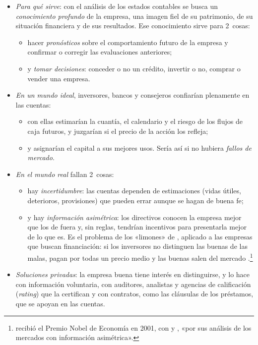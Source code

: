 \documentclass[11pt]{article}
\begin{document}
\begin{itemize}
\item \emph{Para qué sirve}: con el análisis de los estados contables se busca un \emph{conocimiento profundo} de la empresa, una imagen fiel de su patrimonio, de su situación financiera y de sus resultados. Ese conocimiento sirve para 2~cosas:
  \begin{itemize}
  \item hacer \emph{pronósticos} sobre el comportamiento futuro de la empresa y confirmar o corregir las evaluaciones anteriores;
  \item y \emph{tomar decisiones}: conceder o no un crédito, invertir o no, comprar o vender una empresa.
  \end{itemize}
\item \emph{En un mundo ideal}, inversores, bancos y consejeros confiarían plenamente en las cuentas:
  \begin{itemize}
  \item con ellas estimarían la cuantía, el calendario y el riesgo de los flujos de caja futuros, y juzgarían si el precio de la acción los refleja;
  \item y asignarían el capital a sus mejores usos. Sería así si no hubiera \emph{fallos de mercado}.
  \end{itemize}
\item \emph{En el mundo real} fallan 2~cosas:
  \begin{itemize}
  \item hay \emph{incertidumbre}: las cuentas dependen de estimaciones (vidas útiles, deterioros, provisiones) que pueden errar aunque se hagan de buena fe;
  \item y hay \emph{información asimétrica}: los directivos conocen la empresa mejor que los de fuera y, sin reglas, tendrían incentivos para presentarla mejor de lo que es. Es el problema de los «limones» de \textcite{Akerlof1970Market}, aplicado a las empresas que buscan financiación: si los inversores no distinguen las buenas de las malas, pagan por todas un precio medio y las buenas salen del mercado .\footnote{ recibió el Premio Nobel de Economía en 2001, con  y , «por sus análisis de los mercados con información asimétrica»\nocite{Nobel2001AkerlofSpenceStiglitz}.}
  \end{itemize}
\item \emph{Soluciones privadas}: la empresa buena tiene interés en distinguirse, y lo hace con información voluntaria, con auditores, analistas y agencias de calificación (\emph{rating}) que la certifican y con contratos, como las cláusulas de los préstamos, que se apoyan en las cuentas\nocite{HealyPalepu2001Information}.

\end{itemize}
\end{document}
